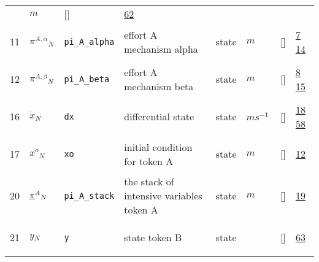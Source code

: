 \begin{longtable}{|p{1cm}|p{3cm}|p{3cm}|p{7cm}|p{3.0cm}|p{3cm}|p{2cm}|p{1cm}|}
             & $ m  $
             & []
             & \hyperlink{"e:62"}{ 62 }
                 \\
    11
             & \hypertarget{"v:11"}{ $ {{\pi^{A,\alpha}}}{_{N}} $}
             & \verb|pi_A_alpha|
             & effort A mechanism alpha
             & \begin{lay}state \end{lay}
             & $ m  $
             & []
             & \hyperlink{"e:7"}{ 7 }
                 \hyperlink{"e:14"}{ 14 }
                 \\
    12
             & \hypertarget{"v:12"}{ $ {{\pi^{A,\beta}}}{_{N}} $}
             & \verb|pi_A_beta|
             & effort A mechanism beta
             & \begin{lay}state \end{lay}
             & $ m  $
             & []
             & \hyperlink{"e:8"}{ 8 }
                 \hyperlink{"e:15"}{ 15 }
                 \\
    16
             & \hypertarget{"v:16"}{ $ {{\dot{x}}}{_{N}} $}
             & \verb|dx|
             & differential state
             & \begin{lay}state \end{lay}
             & $ m s^{-1} \, $
             & []
             & \hyperlink{"e:18"}{ 18 }
                 \hyperlink{"e:58"}{ 58 }
                 \\
    17
             & \hypertarget{"v:17"}{ $ {{x^o}}{_{N}} $}
             & \verb|xo|
             & initial condition for token A
             & \begin{lay}state \end{lay}
             & $ m  $
             & []
             & \hyperlink{"e:12"}{ 12 }
                 \\
    20
             & \hypertarget{"v:20"}{ $ {{{{\protect\underline{\bf{\pi}}}}^{A}}}{_{N}} $}
             & \verb|pi_A_stack|
             & the stack of intensive variables token A
             & \begin{lay}state \end{lay}
             & $ m  $
             & []
             & \hyperlink{"e:19"}{ 19 }
                 \\
    21
             & \hypertarget{"v:21"}{ $ {y}{_{N}} $}
             & \verb|y|
             & state token B
             & \begin{lay}state \end{lay}
             & $  $
             & []
             & \hyperlink{"e:63"}{ 63 }

\end{longtable}
